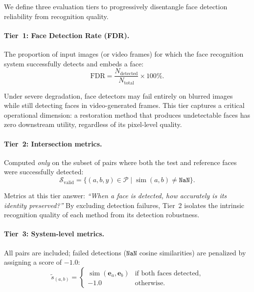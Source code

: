 We define three evaluation tiers to progressively disentangle
face detection reliability from recognition quality.

\paragraph{Tier~1: Face Detection Rate (FDR).}
The proportion of input images (or video frames) for which the
face recognition system successfully detects and embeds a face:
\begin{equation}
    \text{FDR} = \frac{N_{\text{detected}}}{N_{\text{total}}} \times 100\%.
    \label{eq:fdr}
\end{equation}

Under severe degradation, face detectors may fail entirely on
blurred images while still detecting faces in video-generated
frames. This tier captures a critical operational dimension: a
restoration method that produces undetectable faces has zero
downstream utility, regardless of its pixel-level quality.

\paragraph{Tier~2: Intersection metrics.}
Computed \emph{only} on the subset of pairs where both
the test and reference faces were successfully detected:
\begin{equation}
    \mathcal{S}_{\text{valid}} = \bigl\{
        (a, b, y) \in \mathcal{P}
        \;\big|\;
        \operatorname{sim}(a, b) \neq \texttt{NaN}
    \bigr\}.
    \label{eq:valid}
\end{equation}

Metrics at this tier answer: \emph{``When a face is detected, how
accurately is its identity preserved?''} By excluding detection
failures, Tier~2 isolates the intrinsic recognition quality of each
method from its detection robustness.

\paragraph{Tier~3: System-level metrics.}
All pairs are included; failed detections ($\texttt{NaN}$ cosine
similarities) are penalized by assigning a score of $-1.0$:
\begin{equation}
    \tilde{s}_{(a,b)} =
    \begin{cases}
        \operatorname{sim}(\mathbf{e}_a, \mathbf{e}_b) & \text{if both faces detected}, \\
        -1.0 & \text{otherwise}.
    \end{cases}
    \label{eq:penalty}
\end{equation}

